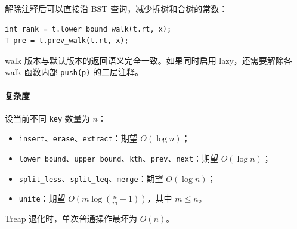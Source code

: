 解除注释后可以直接沿 BST 查询，减少拆树和合树的常数：

\begin{verbatim}
int rank = t.lower_bound_walk(t.rt, x);
T pre = t.prev_walk(t.rt, x);
\end{verbatim}

walk 版本与默认版本的返回语义完全一致。如果同时启用 lazy，还需要解除各 walk 函数内部 \texttt{push(p)} 的二层注释。

\paragraph*{复杂度}

设当前不同 \texttt{key} 数量为 $n$：

\begin{itemize}
  \item \texttt{insert}、\texttt{erase}、\texttt{extract}：期望 $O(\log n)$；
  \item \texttt{lower\_bound}、\texttt{upper\_bound}、\texttt{kth}、\texttt{prev}、\texttt{next}：期望 $O(\log n)$；
  \item \texttt{split\_less}、\texttt{split\_leq}、\texttt{merge}：期望 $O(\log n)$；
  \item \texttt{unite}：期望 $O\!\left(m\log\!\left(\frac{n}{m}+1\right)\right)$，其中 $m\le n$。
\end{itemize}

Treap 退化时，单次普通操作最坏为 $O(n)$。
